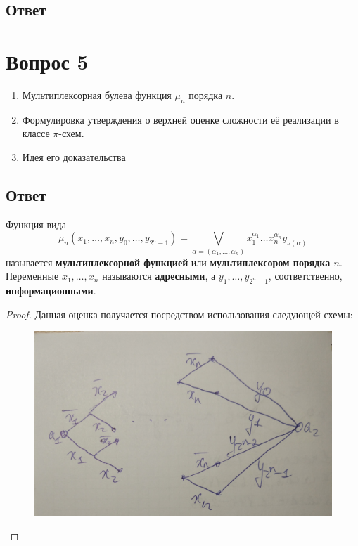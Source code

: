 \documentclass[11pt]{article}
\def\zall{\setcounter{Def}{0}\setcounter{lem}{0}\setcounter{cnsqnc}{0}\setcounter{th}{0}\setcounter{Cmt}{0}\setcounter{equation}{0}\setcounter{stnmt}{0}}
\newcounter{Def}\setcounter{Def}{0}
\def\df{\par\smallskip\refstepcounter{Def}\textbf{\arabic{Def}}}
\newtheorem*{Def}{Определение \df}
\newcounter{lem}\setcounter{lem}{0}
\def\lm{\par\smallskip\refstepcounter{lem}\textbf{\arabic{lem}}}
\newtheorem*{Lemma}{Лемма \lm}
\newcounter{th}\setcounter{th}{0}
\newcounter{cnsqnc}\setcounter{cnsqnc}{0}
\newcounter{Cmt}\setcounter{Cmt}{0}
\newcounter{stnmt}\setcounter{stnmt}{0}
\begin{document}
\subsection{Ответ}
\label{sec:org8e7682a}
\pagebreak
\section{Вопрос 5}
\label{sec:orgc3ad3ac}
\zall
\begin{enumerate}
\item Мультиплексорная булева функция \(\mu_n\) порядка \(n\).
\item Формулировка утверждения о верхней оценке сложности её реализации в классе \(\pi\)-схем.
\item Идея его доказательства
\end{enumerate}
\subsection{Ответ}
\label{sec:orgca68cd6}
   \begin{Def}
Функция вида
\begin{equation*}
\mu_n(x_1, \ldots, x_n, y_0, \ldots, y_{2^n - 1}) = \bigvee\limits_{\alpha = (\alpha_1, \ldots, \alpha_n)}x_1^{\alpha_1}\ldots x_n^{\alpha_n}y_{\nu(\alpha)}
\end{equation*}
называется \textbf{мультиплексорной функцией} или \textbf{мультиплексором порядка $n$}. Переменные $x_1, \ldots, x_n$ называются \textbf{адресными}, а $y_1, \ldots, y_{2^n - 1}$, соответственно, \textbf{информационными}.
   \end{Def}
\begin{proof}
Данная оценка получается посредством использования следующей схемы:
\begin{figure}[h]
\begin{center}
\includegraphics[width=.9\linewidth]{./scheme1.jpg}
\end{center}
\end{figure}
\end{proof}
\pagebreak
\end{document}
